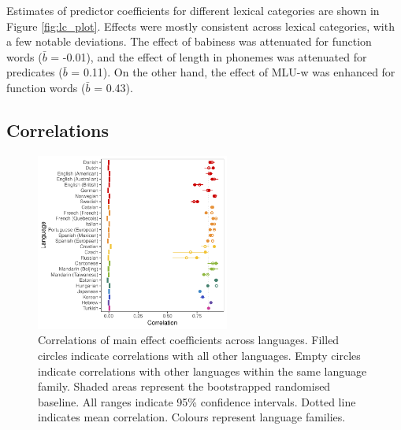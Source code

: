 \documentclass[10pt, letterpaper]{article}
\newenvironment{CodeChunk}{}{}
\begin{document}
Estimates of predictor coefficients for different lexical categories are
shown in Figure \ref{fig:lc_plot}. Effects were mostly consistent across
lexical categories, with a few notable deviations. The effect of
babiness was attenuated for function words (\(\bar{b}\) = -0.01), and
the effect of length in phonemes was attenuated for predicates
(\(\bar{b}\) = 0.11). On the other hand, the effect of MLU-w was
enhanced for function words (\(\bar{b}\) = 0.43).

\hypertarget{correlations}{%
\subsection{Correlations}\label{correlations}}

\begin{CodeChunk}
\begin{figure}[ht]

{\centering \includegraphics[width=240px]{figs/correlations-1}

}

\caption[Correlations of main effect coefficients across languages]{Correlations of main effect coefficients across languages. Filled circles indicate correlations with all other languages. Empty circles indicate correlations with other languages within the same language family. Shaded areas represent the bootstrapped randomised baseline. All ranges indicate 95\% confidence intervals. Dotted line indicates mean correlation. Colours represent language families.}\label{fig:correlations}
\end{figure}
\end{CodeChunk}
\end{document}
